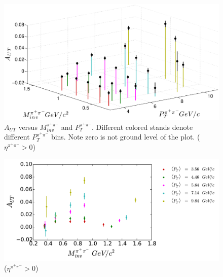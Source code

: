 \documentclass[abstract = on,listof=totoc, bibliography=totoc]{scrreprt}
\newcommand{\ptpair}{P_{T}^{\pi^+\pi^-}}
\newcommand{\mpair}{M_{inv}^{\pi^+\pi^-}}
\newcommand{\etapair}{\eta^{\pi^+\pi^-}}
\begin{document}
\begin{figure}
\begin{center}
\includegraphics[width = 1\textwidth]{ptMass3d82415}
\caption[Asymmetry vs $\mpair$ and $\ptpair$ 2D binning]{$A_{UT}$ versus $\mpair$ and $\ptpair$. Different colored stands denote different $\ptpair$ bins. Note zero is not ground level of the plot. ($\etapair > 0$)}
\label{fig:3dPtMass}
\end{center}
\end{figure}


\begin{figure}
\begin{center}
\includegraphics[width = 1\textwidth]{Asym2dProjPtMass82415_v2}
\caption[]{($\etapair > 0$)}
\label{fig:2dPtMass}
\end{center}
\end{figure}




%
%
\end{document}

